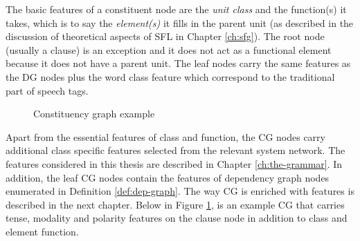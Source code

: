 The basic features of a constituent node are the \textit{unit class} and the function(s) it takes, which is to say the \textit{element(s)} it fills in the parent unit (as described in the discussion of theoretical aspects of SFL in Chapter \ref{ch:sfg}). The root node (usually a clause) is an exception and it does not act as a functional element because it does not have a parent unit. The leaf nodes carry the same features as the DG nodes plus the word class feature which correspond to the traditional part of speech tags. 


\begin{figure}[!ht]
\centering
{}
\caption{Constituency graph example}
\label{fig:mcg-graph}
\end{figure}

Apart from the essential features of class and function, the CG nodes carry additional class specific features selected from the relevant system network. The features considered in this thesis are described in Chapter \ref{ch:the-grammar}. In addition, the leaf CG nodes contain the features of dependency graph nodes enumerated in Definition \ref{def:dep-graph}. The way CG is enriched with features is described in the next chapter. Below in Figure \ref{fig:mcg-graph}, is an example CG that carries tense, modality and polarity features on the clause node in addition to class and element function.

